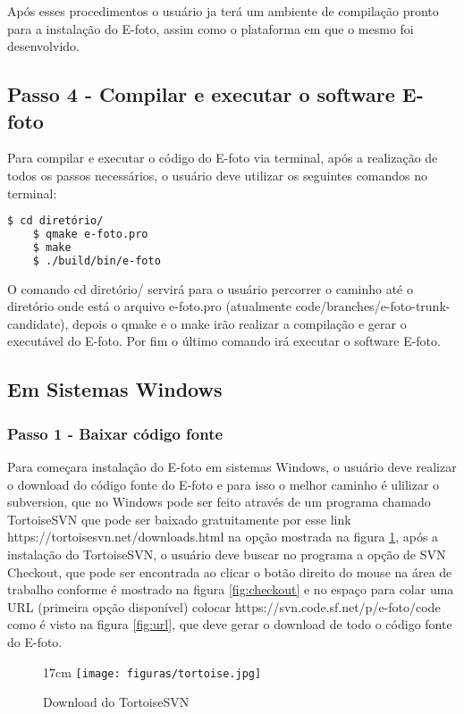 Após esses procedimentos o usuário ja terá um ambiente de compilação pronto para a instalação do E-foto, assim como o plataforma em que o mesmo foi desenvolvido.
    
\subsection{Passo 4 - Compilar e executar o software E-foto}
Para compilar e executar o código do E-foto via terminal, após a realização de todos os passos necessários, o usuário deve utilizar os seguintes comandos no terminal:
\begin{lstlisting}[language=bash]
   	$ cd diretório/
   	$ qmake e-foto.pro
   	$ make
   	$ ./build/bin/e-foto
\end{lstlisting}
   
O comando cd diretório/ servirá para o usuário percorrer o caminho até o diretório onde está o arquivo e-foto.pro (atualmente code/branches/e-foto-trunk-candidate), depois o qmake e o make irão realizar a compilação e gerar o executável do E-foto. Por fim o último comando irá executar o software E-foto.

\subsection{Em Sistemas Windows}

\subsubsection{Passo 1 - Baixar código fonte}
 Para começara instalação do E-foto em sistemas Windows, o usuário deve realizar o download do código fonte do E-foto e para isso o melhor caminho é ulilizar o subversion, que no Windows pode ser feito através de um programa chamado TortoiseSVN que pode ser baixado gratuitamente por esse link https://tortoisesvn.net/downloads.html na opção mostrada na figura \ref{fig:tortoise}, após a instalação do TortoiseSVN, o usuário deve buscar no programa a opção de SVN Checkout, que pode ser encontrada ao clicar o botão direito do mouse na área de trabalho conforme é mostrado na figura \ref{fig:checkout} e no espaço para colar uma URL (primeira opção disponível) colocar https://svn.code.sf.net/p/e-foto/code como é visto na figura \ref{fig:url}, que deve gerar o download de todo o código fonte do E-foto.
 
 \begin{figure}[!ht]{17cm}
 	\texttt{[image: figuras/tortoise.jpg]}
 	\caption{Download do TortoiseSVN} \label{fig:tortoise}
 \end{figure}

